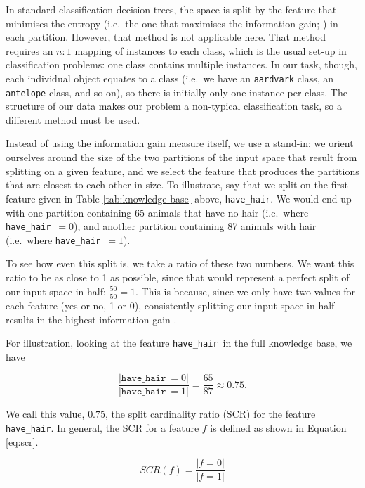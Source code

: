 \documentclass[11pt,a4paper]{article}
\newcommand{\havehair}{\texttt{have\_hair}}
\begin{document}
In standard classification decision trees, the space is split by the feature that minimises the entropy (i.e.\ the one that maximises the information gain; \citealt{Quinlan1986}) in each partition.
However, that method is not applicable here.
That method requires an $n : 1$ mapping of instances to each class, which is the usual set-up in classification problems: one class contains multiple instances.
In our task, though, each individual object equates to a class (i.e.\ we have an \texttt{aardvark} class, an \texttt{antelope} class, and so on), so there is initially only one instance per class.
The structure of our data makes our problem a non-typical classification task, so a different method must be used.

Instead of using the information gain measure itself, we use a stand-in: we orient ourselves around the size of the two partitions of the input space that result from splitting on a given feature, and we select the feature that produces the partitions that are closest to each other in size.
To illustrate, say that we split on the first feature given in Table \ref{tab:knowledge-base} above, \havehair.
We would end up with one partition containing 65 animals that have no hair (i.e.\ where \havehair\ $= 0$), and another partition containing 87 animals with hair (i.e.\ where \havehair\ $= 1$).

To see how even this split is, we take a ratio of these two numbers.
We want this ratio to be as close to 1 as possible, since that would represent a perfect split of our input space in half: $\frac{50}{50} = 1$.
This is because, since we only have two values for each feature (yes or no, 1 or 0), consistently splitting our input space in half results in the highest information gain \citep[cf.][]{Quinlan1986, Bishop2006}.

For illustration, looking at the feature \havehair\ in the full knowledge base, we have

$$\frac{|\havehair\ = 0|}{|\havehair\ = 1|} = \frac{65}{87} \approx 0.75.$$

We call this value, $0.75$, the split cardinality ratio (SCR) for the feature \havehair.
In general, the SCR for a feature $f$ is defined as shown in Equation \ref{eq:scr}.

\begin{equation}
SCR(f) = \frac{|f = 0|}{|f = 1|} 
\label{eq:scr}
\end{equation}
\end{document}
